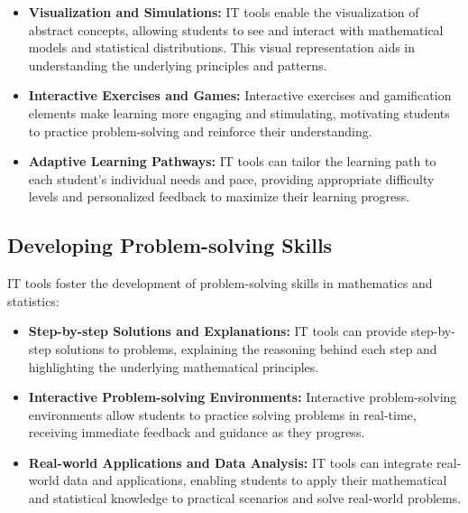 \documentclass[20pt]{report}
\begin{document}
\begin{itemize}

\item \textbf{Visualization and Simulations:} IT tools enable the visualization of abstract concepts, allowing students to see and interact with mathematical models and statistical distributions. This visual representation aids in understanding the underlying principles and patterns.

\item \textbf{Interactive Exercises and Games:} Interactive exercises and gamification elements make learning more engaging and stimulating, motivating students to practice problem-solving and reinforce their understanding.

\item \textbf{Adaptive Learning Pathways:} IT tools can tailor the learning path to each student's individual needs and pace, providing appropriate difficulty levels and personalized feedback to maximize their learning progress.

\end{itemize}

\subsection{Developing Problem-solving Skills}

IT tools foster the development of problem-solving skills in mathematics and statistics:

\begin{itemize}

\item \textbf{Step-by-step Solutions and Explanations:} IT tools can provide step-by-step solutions to problems, explaining the reasoning behind each step and highlighting the underlying mathematical principles.

\item \textbf{Interactive Problem-solving Environments:} Interactive problem-solving environments allow students to practice solving problems in real-time, receiving immediate feedback and guidance as they progress.

\item \textbf{Real-world Applications and Data Analysis:} IT tools can integrate real-world data and applications, enabling students to apply their mathematical and statistical knowledge to practical scenarios and solve real-world problems.

\end{itemize}
\end{document}
